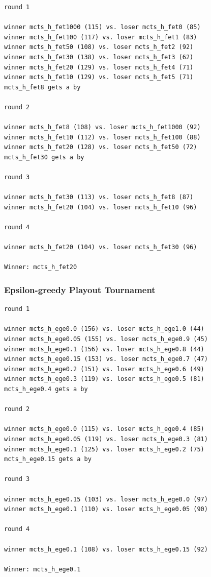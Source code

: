 \documentclass{article}
\begin{document}
\begin{verbatim}
round 1

winner mcts_h_fet1000 (115) vs. loser mcts_h_fet0 (85)
winner mcts_h_fet100 (117) vs. loser mcts_h_fet1 (83)
winner mcts_h_fet50 (108) vs. loser mcts_h_fet2 (92)
winner mcts_h_fet30 (138) vs. loser mcts_h_fet3 (62)
winner mcts_h_fet20 (129) vs. loser mcts_h_fet4 (71)
winner mcts_h_fet10 (129) vs. loser mcts_h_fet5 (71)
mcts_h_fet8 gets a by

round 2

winner mcts_h_fet8 (108) vs. loser mcts_h_fet1000 (92)
winner mcts_h_fet10 (112) vs. loser mcts_h_fet100 (88)
winner mcts_h_fet20 (128) vs. loser mcts_h_fet50 (72)
mcts_h_fet30 gets a by

round 3

winner mcts_h_fet30 (113) vs. loser mcts_h_fet8 (87)
winner mcts_h_fet20 (104) vs. loser mcts_h_fet10 (96)

round 4

winner mcts_h_fet20 (104) vs. loser mcts_h_fet30 (96)

Winner: mcts_h_fet20
\end{verbatim}

\subsubsection{Epsilon-greedy Playout Tournament}

\begin{verbatim}
round 1

winner mcts_h_ege0.0 (156) vs. loser mcts_h_ege1.0 (44)
winner mcts_h_ege0.05 (155) vs. loser mcts_h_ege0.9 (45)
winner mcts_h_ege0.1 (156) vs. loser mcts_h_ege0.8 (44)
winner mcts_h_ege0.15 (153) vs. loser mcts_h_ege0.7 (47)
winner mcts_h_ege0.2 (151) vs. loser mcts_h_ege0.6 (49)
winner mcts_h_ege0.3 (119) vs. loser mcts_h_ege0.5 (81)
mcts_h_ege0.4 gets a by

round 2

winner mcts_h_ege0.0 (115) vs. loser mcts_h_ege0.4 (85)
winner mcts_h_ege0.05 (119) vs. loser mcts_h_ege0.3 (81)
winner mcts_h_ege0.1 (125) vs. loser mcts_h_ege0.2 (75)
mcts_h_ege0.15 gets a by

round 3

winner mcts_h_ege0.15 (103) vs. loser mcts_h_ege0.0 (97)
winner mcts_h_ege0.1 (110) vs. loser mcts_h_ege0.05 (90)

round 4

winner mcts_h_ege0.1 (108) vs. loser mcts_h_ege0.15 (92)

Winner: mcts_h_ege0.1
\end{verbatim}
\end{document}
